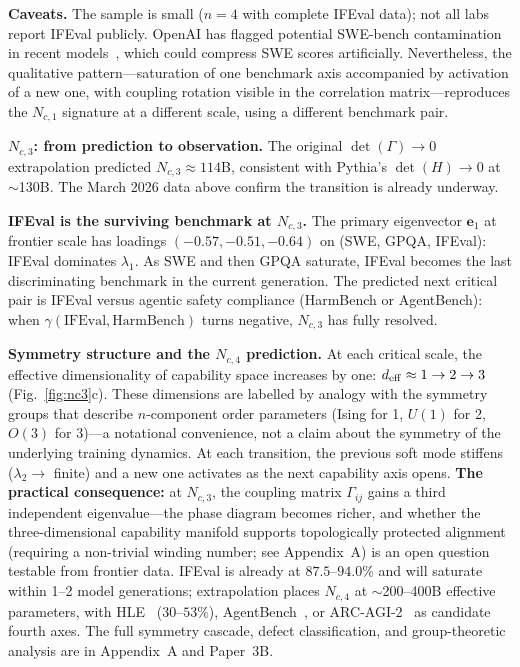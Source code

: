 \documentclass[11pt]{article}
\begin{document}
\textbf{Caveats.}
The sample is small ($n=4$ with complete IFEval data); not all labs report IFEval publicly.
OpenAI has flagged potential SWE-bench contamination in recent models~\cite{swebench2024}, which could compress SWE scores artificially.
Nevertheless, the qualitative pattern---saturation of one benchmark axis accompanied by activation of a new one, with coupling rotation visible in the correlation matrix---reproduces the $N_{c,1}$ signature at a different scale, using a different benchmark pair.

\textbf{$N_{c,3}$: from prediction to observation.}
The original $\det(\Gamma) \to 0$ extrapolation predicted $N_{c,3} \approx 114$B, consistent with Pythia's $\det(H) \to 0$ at $\sim$130B.
The March 2026 data above confirm the transition is already underway.

\textbf{IFEval is the surviving benchmark at $N_{c,3}$.}
The primary eigenvector $\mathbf{e}_1$ at frontier scale has loadings $(-0.57, -0.51, -0.64)$ on (SWE, GPQA, IFEval): IFEval dominates $\lambda_1$.
As SWE and then GPQA saturate, IFEval becomes the last discriminating benchmark in the current generation.
The predicted next critical pair is IFEval versus agentic safety compliance (HarmBench or AgentBench): when $\gamma(\text{IFEval}, \text{HarmBench})$ turns negative, $N_{c,3}$ has fully resolved.

\textbf{Symmetry structure and the $N_{c,4}$ prediction.}
At each critical scale, the effective dimensionality of capability space increases by one: $d_{\rm eff} \approx 1 \to 2 \to 3$ (Fig.~\ref{fig:nc3}c).
These dimensions are labelled by analogy with the symmetry groups that describe $n$-component order parameters (Ising for 1, $U(1)$ for 2, $O(3)$ for 3)---a notational convenience, not a claim about the symmetry of the underlying training dynamics.
At each transition, the previous soft mode stiffens ($\lambda_2 \to$ finite) and a new one activates as the next capability axis opens.
\textbf{The practical consequence:} at $N_{c,3}$, the coupling matrix $\Gamma_{ij}$ gains a third independent eigenvalue---the phase diagram becomes richer, and whether the three-dimensional capability manifold supports topologically protected alignment (requiring a non-trivial winding number; see Appendix~A) is an open question testable from frontier data.
IFEval is already at $87.5$--$94.0\%$ and will saturate within 1--2 model generations; extrapolation places $N_{c,4}$ at $\sim$200--400B effective parameters, with HLE~\cite{hle2025} ($30$--$53\%$), AgentBench~\cite{agentbench2023}, or ARC-AGI-2~\cite{arcagi2} as candidate fourth axes.
The full symmetry cascade, defect classification, and group-theoretic analysis are in Appendix~A and Paper~3B.
\end{document}
